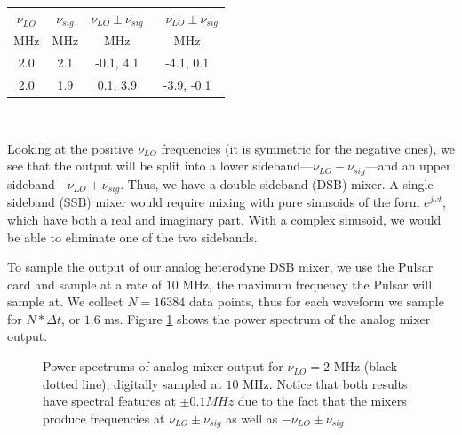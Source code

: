 \documentclass[12pt]{article}
\begin{document}
\begin{center}
  \begin{tabular}{c | c | c | c }
    $\nu_{LO}$ & $\nu_{sig}$ & $\nu_{LO} \pm \nu_{sig}$ & $-\nu_{LO} \pm \nu_{sig}$ \\
    MHz & MHz & MHz & MHz \\ \hline
    2.0 & 2.1 & -0.1, 4.1 & -4.1, 0.1 \\
    2.0 & 1.9 & 0.1, 3.9 & -3.9, -0.1 \\
  \end{tabular}\\
\end{center}

Looking at the positive $\nu_{LO}$ frequencies (it is symmetric for the negative ones), we see that the output will be split into a lower sideband---$\nu_{LO} - \nu_{sig}$---and an upper sideband---$\nu_{LO} + \nu_{sig}$. Thus, we have a double sideband (DSB) mixer. A single sideband (SSB) mixer would require mixing with pure sinusoids of the form $e^{j\omega t}$, which have both a real and imaginary part. With a complex sinusoid, we would be able to eliminate one of the two sidebands.

To sample the output of our analog heterodyne DSB mixer, we use the Pulsar card and sample at a rate of $10$ MHz, the maximum frequency the Pulsar will sample at. We collect $N=16384$ data points, thus for each waveform we sample for $N*\Delta{t}$, or $1.6$ ms. Figure \ref{fig:analogmixing_spectrum} shows the power spectrum of the analog mixer output.

\begin{figure}[H]
\caption[SODUMB]{Power spectrums of analog mixer output for $\nu_{LO}=2$ MHz (black dotted line), digitally sampled at $10$ MHz. Notice that both results have spectral features at $\pm 0.1 MHz$ due to the fact that the mixers produce frequencies at $\nu_{LO} \pm \nu_{sig}$ as well as $-\nu_{LO} \pm \nu_{sig}$}
\label{fig:analogmixing_spectrum}
\end{figure}
\end{document}
